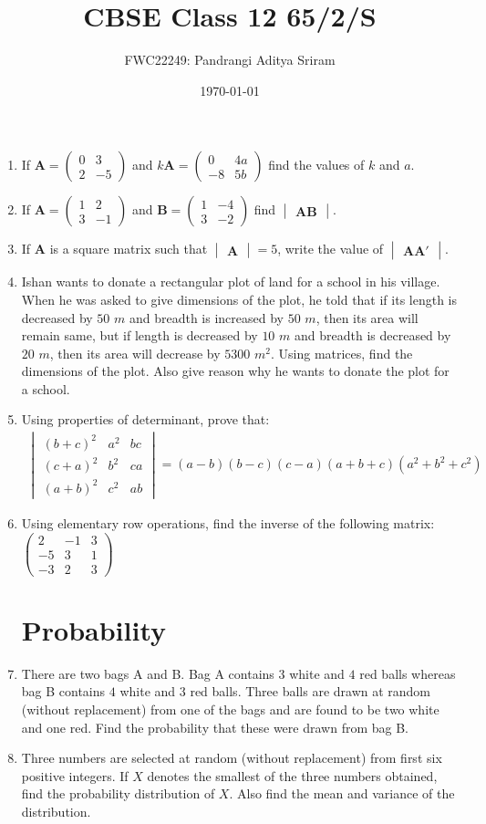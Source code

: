 \documentclass[12pt,-letter paper]{article}
\title{CBSE Class 12 65/2/S}
\date{\today}
\author{FWC22249: Pandrangi Aditya Sriram}
\providecommand{\brak}[1]{\ensuremath{\left(#1\right)}}
\theoremstyle{remark}
\newcommand{\myvec}[1]{\ensuremath{\begin{pmatrix}#1\end{pmatrix}}}
\newcommand{\mydet}[1]{\ensuremath{\begin{vmatrix}#1\end{vmatrix}}}
\let\vec\mathbf
\begin{document}
\maketitle

\begin{enumerate}
\section{Matrices}
\item If $\vec{A} = \myvec{0 & 3 \\ 2 & -5}$ and $k\vec{A} = \myvec{0 & 4a \\ -8 & 5b}$ find the values of $k$ and $a$.
\item If $\vec{A} = \myvec{1 & 2 \\ 3 & -1}$ and $\vec{B} = \myvec{1 & -4 \\ 3 & -2}$ find $\mydet{\vec{A}\vec{B}}$.
\item If $\vec{A}$ is a square matrix such that $\mydet{\vec{A}} = 5$, write the value of $\mydet{\vec{A}\vec{A}'}$.
\item Ishan wants to donate a rectangular plot of land for a school in his village. When he was asked to give dimensions of the plot, he told that if its length is decreased by $50$ $m$ and breadth is increased by $50$ $m$, then its area will remain same, but if length is decreased by $10$ $m$ and breadth is decreased by $20$ $m$, then its area will decrease by $5300$ $m^{2}$. Using matrices, find the dimensions of the plot. Also give reason why he wants to donate the plot for a school.
\item Using properties of determinant, prove that:
\begin{align*}
\mydet{\brak{b+c}^{2} & a^{2} & bc \\ \brak{c+a}^{2} & b^{2} & ca \\ \brak{a+b}^{2} & c^{2} & ab} = \brak{a-b}\brak{b-c}\brak{c-a}\brak{a+b+c}\brak{a^{2} + b^{2} + c^{2}}
\end{align*}
\item Using elementary row operations, find the inverse of the following matrix: $\myvec{2 & -1 & 3 \\ -5 & 3 & 1 \\ -3 & 2 & 3}$
\section{Probability}
\item There are two bags A and B. Bag A contains $3$ white and $4$ red balls whereas bag B contains $4$ white and $3$ red balls. Three balls are drawn at random (without replacement) from one of the bags and are found to be two white and one red. Find the probability that these were drawn from bag B.
\item Three numbers are selected at random (without replacement) from first six positive integers. If $X$ denotes the smallest of the three numbers obtained, find the probability distribution of $X$. Also find the mean and variance of the distribution.

\end{enumerate}
\end{document}

